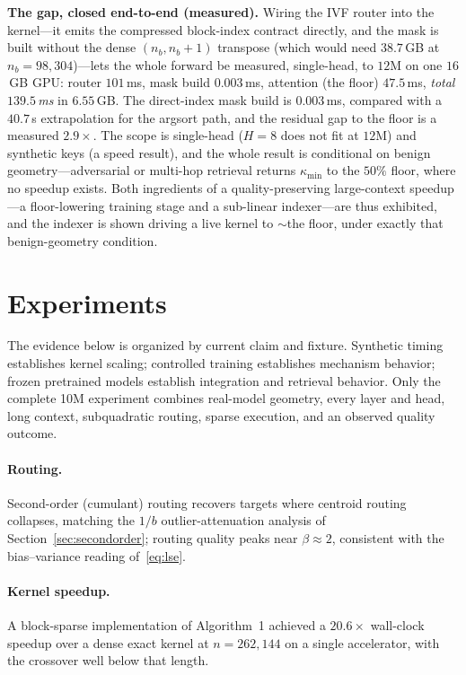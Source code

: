 \documentclass[11pt]{article}
\numberwithin{equation}{section}
\begin{document}
\medskip\noindent\textbf{The gap, closed end-to-end (measured).} Wiring the IVF router into the kernel---it
emits the compressed block-index contract directly, and the mask is built without the dense
$(n_b,n_b{+}1)$ transpose (which would need $38.7$\,GB at $n_b{=}98{,}304$)---lets the whole forward be measured,
single-head, to $12\mathrm{M}$ on one $16$\,GB GPU: router $101$\,ms, mask build $0.003$\,ms, attention (the
floor) $47.5$\,ms, \emph{total $139.5$\,ms} in $6.55$\,GB. The direct-index mask build is $0.003$\,ms,
compared with a $40.7$\,s extrapolation for the argsort path, and the residual gap to the floor is a measured
$2.9\times$. The scope is single-head ($H{=}8$ does not fit at $12\mathrm{M}$) and synthetic keys (a speed result),
and the whole result is conditional on benign geometry---adversarial or multi-hop retrieval returns
$\kappa_{\min}$ to the $50\%$ floor, where no speedup exists. Both ingredients of a quality-preserving
large-context speedup---a floor-lowering training stage and a sub-linear indexer---are thus exhibited, and the
indexer is shown driving a live kernel to ${\sim}$the floor, under exactly that benign-geometry condition.

\section{Experiments}\label{sec:experiments}

The evidence below is organized by current claim and fixture. Synthetic timing establishes kernel scaling;
controlled training establishes mechanism behavior; frozen pretrained models establish integration and
retrieval behavior. Only the complete 10M experiment combines real-model geometry, every layer and head,
long context, subquadratic routing, sparse execution, and an observed quality outcome.

\paragraph{Routing.} Second-order (cumulant) routing recovers targets where centroid routing collapses,
matching the $1/b$ outlier-attenuation analysis of Section~\ref{sec:secondorder}; routing quality peaks near
$\beta\approx2$, consistent with the bias--variance reading of~\eqref{eq:lse}.

\paragraph{Kernel speedup.} A block-sparse implementation of Algorithm~1 achieved a $20.6\times$ wall-clock
speedup over a dense exact kernel at $n=262{,}144$ on a single accelerator, with the crossover well below that
length.
\end{document}
